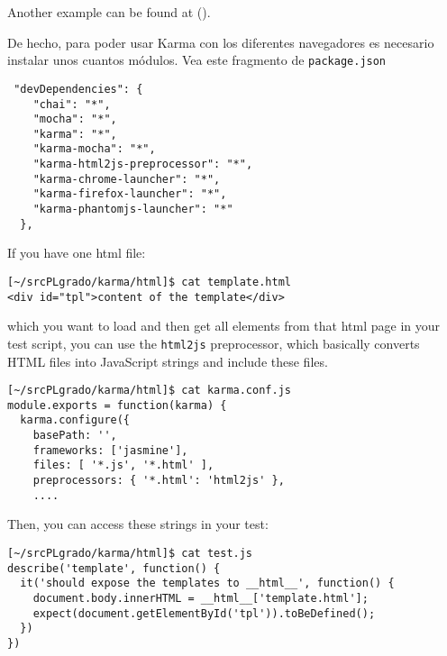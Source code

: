 Another example can be found at
().

De hecho, para poder usar Karma con los diferentes navegadores es necesario
instalar unos cuantos módulos. Vea este fragmento de \verb|package.json|
\begin{verbatim}
 "devDependencies": {
    "chai": "*",
    "mocha": "*",
    "karma": "*",
    "karma-mocha": "*",
    "karma-html2js-preprocessor": "*",
    "karma-chrome-launcher": "*",
    "karma-firefox-launcher": "*",
    "karma-phantomjs-launcher": "*"
  },
\end{verbatim}


If you have one html file:
\begin{verbatim}
[~/srcPLgrado/karma/html]$ cat template.html 
<div id="tpl">content of the template</div>
\end{verbatim}
which you want to load and then get all elements
from that html page in your test script,
you can use the \verb|html2js| preprocessor, which basically converts
HTML files into JavaScript strings and include these files.
\begin{verbatim}
[~/srcPLgrado/karma/html]$ cat karma.conf.js 
module.exports = function(karma) {
  karma.configure({
    basePath: '',
    frameworks: ['jasmine'],
    files: [ '*.js', '*.html' ], 
    preprocessors: { '*.html': 'html2js' },
    ....
\end{verbatim}
Then, you can access these strings in your test:
\begin{verbatim}
[~/srcPLgrado/karma/html]$ cat test.js 
describe('template', function() {
  it('should expose the templates to __html__', function() {
    document.body.innerHTML = __html__['template.html'];
    expect(document.getElementById('tpl')).toBeDefined();
  })
})
\end{verbatim}

